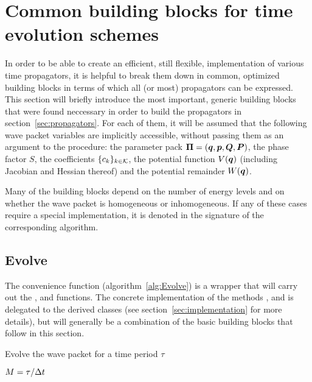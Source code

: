 \section{Common building blocks for time evolution schemes}
\label{sec:buildingblocks}
%
In order to be able to create an efficient, still flexible, implementation of various time propagators, it is helpful to break them down in common, optimized building blocks in terms of which all (or most) propagators can be expressed.
This section will briefly introduce the most important, generic building blocks that were found neccessary in order to build the propagators in section~\ref{sec:propagators}.
For each of them, it will be assumed that the following wave packet variables are implicitly accessible, without passing them as an argument to the procedure: the parameter pack $\bm{\Pi} = (\bm{q},\bm{p},\bm{Q},\bm{P})$, the phase factor $S$, the coefficients $\{ c_k \}_{k \in \mathcal{K}}$, the potential function $V(\bm{q})$ (including Jacobian and Hessian thereof) and the potential remainder $W(\bm{q})$.
\par\medskip
%
Many of the building blocks depend on the number of energy levels and on whether the wave packet is homogeneous or inhomogeneous.
If any of these cases require a special implementation, it is denoted in the signature of the corresponding algorithm.


\subsection{Evolve}
\label{subsec:evolve}
The convenience function  (algorithm~\ref{alg:Evolve}) is a wrapper that will carry out the ,  and  functions.
The concrete implementation of the methods ,  and  is delegated to the derived classes (see section~\ref{sec:implementation} for more details),
but will generally be a combination of the basic building blocks that follow in this section.
%
\begin{algorithm}[h]
	\caption{Evolve the wave packet for a time period $\tau$}
	\label{alg:Evolve}
	\begin{algorithmic}
		\State
		\State
		\State $M = \tau/\Delta t$
		\State {}
			\State {}
		\EndFor
		\State {}
	\EndProcedure
	\State
	\end{algorithmic}
\end{algorithm}


